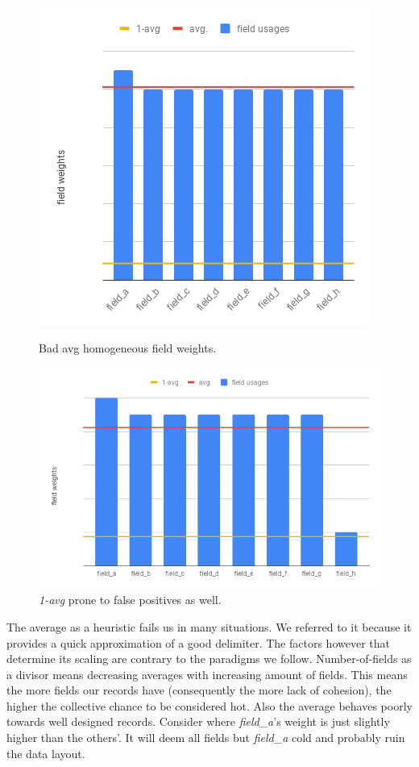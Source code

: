 \begin{figure}[ht]
	\begin{minipage}[b]{0.5\linewidth}
		\centering
		\includegraphics[width=\textwidth,height=.7\textwidth]{PICs/avg_as_delimiter_5}
		\caption{Bad avg homogeneous field weights.}
		\label{avg_delimiter_bad_4}
	\end{minipage}
	\hspace{0.5cm}
	\begin{minipage}[b]{0.5\linewidth}
		\centering
		\includegraphics[width=\textwidth,height=.7\textwidth]{PICs/avg_as_delimiter_6}
		\caption{\textit{1-avg} prone to false positives as well.}
		\label{avg_delimiter_bad_5}
	\end{minipage}
\end{figure}
The average as a heuristic fails us in many situations. We referred to it because it provides a quick approximation of a good delimiter. The factors however that determine its scaling are contrary to the paradigms we follow. Number-of-fields as a divisor means decreasing averages with increasing amount of fields. This means the more fields our records have (consequently the more lack of cohesion), the higher the collective chance to be considered hot. Also the average behaves poorly towards well designed records. Consider  where \textit{field\_a}'s weight is just slightly higher than the others'. It will deem all fields but \textit{field\_a} cold and probably ruin the data layout.\\\\
